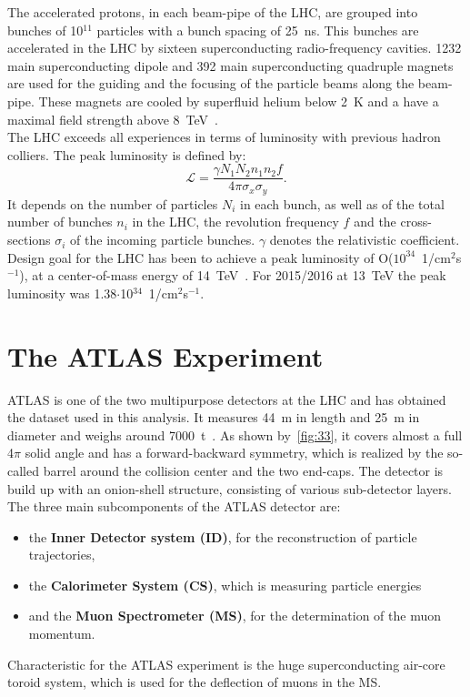 \noindent The accelerated protons, in each beam-pipe of the LHC, are grouped into bunches of 10$^{11}$ particles with a bunch spacing of 25~ns. This bunches are accelerated in the LHC by sixteen superconducting radio-frequency cavities. 1232 main superconducting dipole and 392 main superconducting quadruple magnets are used for the guiding and the focusing of the particle beams along the beam-pipe. These magnets are cooled by superfluid helium below 2~K and a have a maximal field strength above 8~TeV~\cite{Evans:2008zzb}.\\     


\noindent The LHC  exceeds all experiences in terms of luminosity with previous hadron colliers. The peak luminosity is defined by:
\begin{equation}
\mathscr{L} = \frac{\gamma N_1N_2n_1n_2f}{4\pi \sigma_x \sigma_y }.
\end{equation}
 It depends on the number of particles $N_i$ in each bunch, as well as of the total number of bunches $n_i$ in the LHC, the revolution frequency $f$ and the cross-sections $\sigma_i$ of the incoming particle bunches. $\gamma$ denotes the relativistic coefficient. Design goal for the LHC has been to achieve a peak luminosity of O($10^{34}$~1/cm$^2$s$^{-1}$), at a center-of-mass energy of 14~TeV~\cite{Bruning:2004ej}. For 2015/2016 at 13~TeV the peak luminosity was 1.38$\cdot$10$^{34}$~1/cm$^2$s$^{-1}$.  
 
 
\section{The ATLAS Experiment}\label{ATLAS}
 ATLAS  is one of the two multipurpose detectors at the LHC and has obtained the dataset used in this analysis. It measures 44~m in length and 25~m in diameter and weighs around 7000~t~\cite{Aad:2008zzm}. 
 As shown by~\cref{fig:33}, it covers almost a full 4$\pi$ solid angle and has a forward-backward symmetry, which is realized by the so-called barrel around the collision center and the two end-caps. The detector is build up with an onion-shell structure, consisting of various sub-detector layers. The three main subcomponents of the ATLAS detector are:
 \begin{itemize}
 	\item the \textbf{Inner Detector system (ID)}, for the reconstruction of particle trajectories, 
 	\item  the \textbf{Calorimeter System (CS)}, which is measuring particle energies
 	\item  and the \textbf{Muon Spectrometer (MS)}, for the determination of the muon momentum.
 \end{itemize} 
Characteristic for the ATLAS experiment is the huge superconducting air-core toroid system, which is used for the deflection of muons in the MS.\\  

